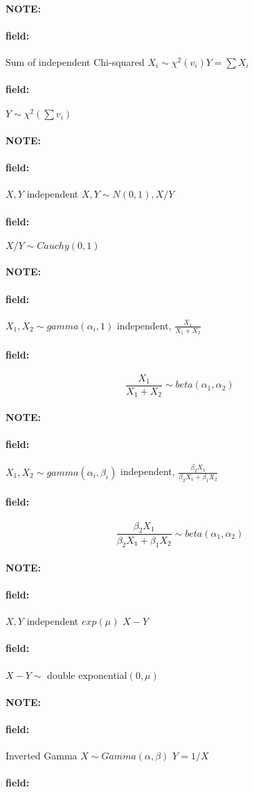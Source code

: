 \documentclass[12pt]{article}
\newenvironment{note}{\paragraph{NOTE:}}{}
\newenvironment{field}{\paragraph{field:}}{}
\begin{document}
\begin{note}
  \begin{field}
    Sum of independent Chi-squared
    $ X_i \sim \chi^2(v_i) Y = \sum X_i$
  \end{field}
  \begin{field}
    $Y \sim \chi^2(\sum v_i)$
  \end{field}
\end{note}


\begin{note}
  \begin{field}
    $X,Y$ independent
    $X,Y \sim N(0,1), X/Y$
  \end{field}
  \begin{field}
    $X/Y \sim Cauchy(0,1)$
  \end{field}
\end{note}





\begin{note}
  \begin{field}
    $X_1,X_2 \sim gamma(\alpha_i,1)$ independent, $\frac{X_1}{X_1 + X_2} $
  \end{field}
  \begin{field}
    $$ \frac{X_1}{X_1 + X_2} \sim beta(\alpha_1,\alpha_2)$$
  \end{field}
\end{note}

\begin{note}
  \begin{field}
    $X_1,X_2 \sim gamma(\alpha_i,\beta_i)$ independent, $\frac{\beta_2X_1}{\beta_2X_1 + \beta_1X_2} $
  \end{field}
  \begin{field}
    $$ \frac{\beta_2X_1}{\beta_2X_1 + \beta_1X_2}\sim beta(\alpha_1,\alpha_2)$$
  \end{field}
\end{note}

\begin{note}
  \begin{field}
    $X,Y $ independent $exp(\mu)$ $X-Y$
  \end{field}
  \begin{field}
    $X-Y \sim $ double exponential$(0,\mu)$
  \end{field}
\end{note}


\begin{note}
  \begin{field}
    Inverted Gamma
    $X \sim Gamma(\alpha,\beta)$ $Y = 1/X$
  \end{field}
  \begin{field}

  \end{field}
\end{note}
\end{document}
